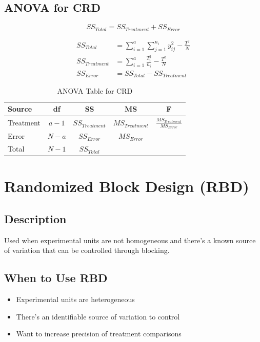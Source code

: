 \documentclass[twoside]{book}
\begin{document}
\subsection{ANOVA for CRD}

\begin{equation}
SS_{Total} = SS_{Treatment} + SS_{Error}
\end{equation}

\begin{align}
SS_{Total} &= \sum_{i=1}^{a}\sum_{j=1}^{n_i} y_{ij}^2 - \frac{T^2}{N} \\
SS_{Treatment} &= \sum_{i=1}^{a} \frac{T_i^2}{n_i} - \frac{T^2}{N} \\
SS_{Error} &= SS_{Total} - SS_{Treatment}
\end{align}

\begin{table}[H]
\centering
\caption{ANOVA Table for CRD}
\begin{tabular}{|l|c|c|c|c|}
\hline
\textbf{Source} & \textbf{df} & \textbf{SS} & \textbf{MS} & \textbf{F} \\
\hline
Treatment & $a-1$ & $SS_{Treatment}$ & $MS_{Treatment}$ & $\frac{MS_{Treatment}}{MS_{Error}}$ \\
Error & $N-a$ & $SS_{Error}$ & $MS_{Error}$ & \\
\hline
Total & $N-1$ & $SS_{Total}$ & & \\
\hline
\end{tabular}
\end{table}

\section{Randomized Block Design (RBD)}

\subsection{Description}

Used when experimental units are not homogeneous and there's a known source of variation that can be controlled through blocking.

\subsection{When to Use RBD}

\begin{itemize}
    \item Experimental units are heterogeneous
    \item There's an identifiable source of variation to control
    \item Want to increase precision of treatment comparisons
\end{itemize}
\end{document}
